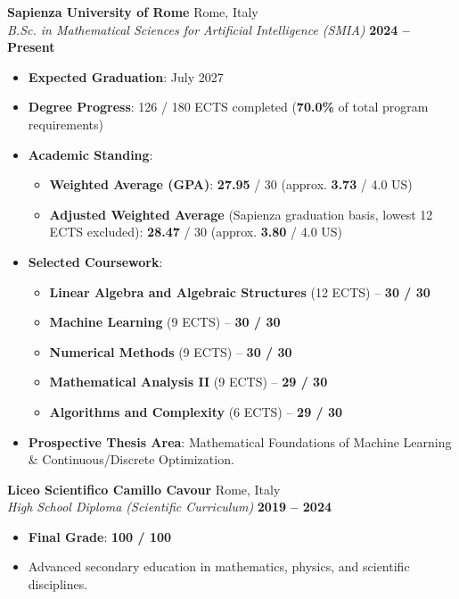 \documentclass[10pt,a4paper]{article}
\begin{document}
\noindent
\textbf{Sapienza University of Rome} \hfill \textcolor{subtext}{Rome, Italy} \\
\textit{B.Sc. in Mathematical Sciences for Artificial Intelligence (SMIA)} \hfill \textbf{2024 -- Present}
\begin{itemize}
    \item \textbf{Expected Graduation}: July 2027
    \item \textbf{Degree Progress}: 126 / 180 ECTS completed (\textbf{70.0\%} of total program requirements)
    \item \textbf{Academic Standing}:
    \begin{itemize}[label=--]
        \item \textbf{Weighted Average (GPA)}: \textbf{27.95} / 30 (approx. \textbf{3.73} / 4.0 US)
        \item \textbf{Adjusted Weighted Average} (Sapienza graduation basis, lowest 12 ECTS excluded): \textbf{28.47} / 30 (approx. \textbf{3.80} / 4.0 US)
    \end{itemize}
    \item \textbf{Selected Coursework}:
    \begin{itemize}[label=--]
        \item \textbf{Linear Algebra and Algebraic Structures} (12 ECTS) -- \textbf{30 / 30}
        \item \textbf{Machine Learning} (9 ECTS) -- \textbf{30 / 30}
        \item \textbf{Numerical Methods} (9 ECTS) -- \textbf{30 / 30}
        \item \textbf{Mathematical Analysis II} (9 ECTS) -- \textbf{29 / 30}
        \item \textbf{Algorithms and Complexity} (6 ECTS) -- \textbf{29 / 30}
    \end{itemize}
    \item \textbf{Prospective Thesis Area}: Mathematical Foundations of Machine Learning \& Continuous/Discrete Optimization.
\end{itemize}

\vspace{5pt}
\noindent
\textbf{Liceo Scientifico Camillo Cavour} \hfill \textcolor{subtext}{Rome, Italy} \\
\textit{High School Diploma (Scientific Curriculum)} \hfill \textbf{2019 -- 2024}
\begin{itemize}
    \item \textbf{Final Grade}: \textbf{100 / 100}
    \item Advanced secondary education in mathematics, physics, and scientific disciplines.
\end{itemize}
\end{document}
